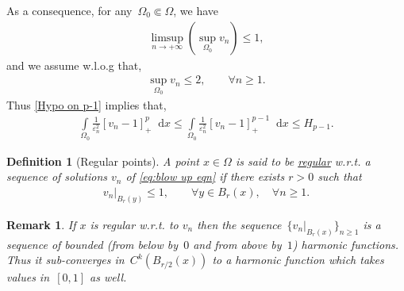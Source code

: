\documentclass[10pt]{amsart}
\newcommand{\parenthesis}[1]{\left(#1\right)} %
\newcommand{\dd}{\mathop{}\!\mathrm{d}}
\newcommand{\eps}{\varepsilon}
\renewcommand{\to}{\rightarrow}
\newcommand{\om}{\Omega}
\renewcommand{\le}{\leq}
\newtheorem{remark}[theorem]{Remark}
\newtheorem{definition}[theorem]{Definition}
\begin{document}
    As a consequence, for any~$\Omega_0\Subset \Omega$, we have
    \begin{align*}
        \limsup_{n\to+\infty}\parenthesis{\sup_{\Omega_0} v_n } \leq 1,
    \end{align*}
    and we assume w.l.o.g that,
    \begin{align*}
        \sup_{\Omega_0} v_n \leq 2, \qquad \forall n\geq 1.
    \end{align*}
    Thus \eqref{Hypo on p-1} implies that,
    \begin{align*}
        \int\limits_{\Omega_0} \frac{1}{\eps_n^2} [v_n-1]_+^p \dd{x}
        \leq \int\limits_{\Omega_0}\frac{1}{\eps_n^2}[v_n-1]_+^{p-1}\dd{x} \leq H_{p-1}.
    \end{align*}

    \begin{definition}[Regular points]\label{def:reg} A point $x\in \om$ is said to be \underline{regular} w.r.t. a sequence of solutions $v_n$ of \eqref{eq:blow up eqn}
    if there exists $r>0$ such that
    \begin{align*}
        v_n|_{B_r(y)}\le 1, \qquad \forall y\in B_r(x), \quad \forall n\geq 1.
    \end{align*}
    \end{definition}

 \begin{remark}\label{rem:reg} If $x$ is regular w.r.t. to $v_n$ then the sequence~$\{v_n|_{B_r(x)}\}_{n\geq 1}$ is a sequence of bounded
 (from below by~$0$ and from above by~$1$) harmonic functions. Thus it sub-converges in~$C^k(B_{r/2}(x))$
 to a harmonic function which takes values in~$[0,1]$ as well.
 \end{remark}


\bigskip
\end{document}
